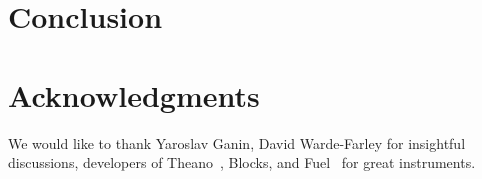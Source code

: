 \documentclass{article}
\begin{document}
\section{Conclusion}


\section*{Acknowledgments}

We would like to thank Yaroslav Ganin, David Warde-Farley for insightful discussions,
developers of Theano~\cite{2016arXiv160502688short}, Blocks, and Fuel~\cite{MerrienboerBDSW15} 
for great instruments.



\end{document}
